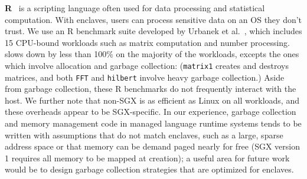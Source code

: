 {\bf R}~\cite{r-project} is a scripting language often used for
data processing and statistical computation.
With enclaves, users can process sensitive data on an
OS they don't trust.
We use an R benchmark suite developed by Urbanek et al.~\cite{r-benchmark-25}, which includes 15 CPU-bound workloads such as matrix computation and number processing.
\graphenesgx{} slows down by less than 100\% on the majority of the workloads, excepts the ones which involve allocation and garbage collection: ({\tt matrix1} creates and destroys matrices, and both {\tt FFT} and {\tt hilbert} involve heavy garbage collection.)
Aside from garbage collection, these R benchmarks do not frequently interact with the host.
We further note that non-SGX \graphene{} is as efficient as Linux on all workloads, 
and these overheads appear to be SGX-specific.
In our experience, garbage collection and memory management code in managed language runtime
systems tends to be written with assumptions that do not match enclaves,
such as a large, sparse address space or that memory can be demand paged 
nearly for free (SGX version 1 requires all memory to be mapped
at creation); a useful area for future work would be to design
garbage collection strategies that are optimized for enclaves.

